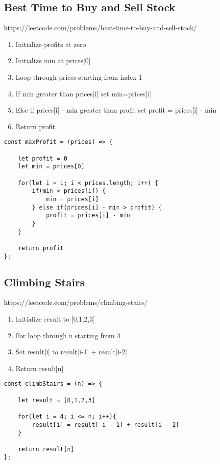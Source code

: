 \documentclass[10pt]{article}
\begin{document}
\medskip %







\pagebreak %
\medskip   
\subsection{Best Time to Buy and Sell Stock}
https://leetcode.com/problems/best-time-to-buy-and-sell-stock/

\begin{enumerate}
	\item Initialize profits at zero
	\item Initialize min at prices[0]
	\item Loop through prices starting from index 1 
	\item If min greater than prices[i] set min=prices[i]
	\item Else if prices[i] - min greater than profit set profit = prices[i] - min
	\item Return profit
\end{enumerate}

\begin{lstlisting}[title=Solution maxProfit, captionpos=t]
const maxProfit = (prices) => {
    
    let profit = 0
    let min = prices[0]
    
    for(let i = 1; i < prices.length; i++) { 
        if(min > prices[i]) {
            min = prices[i]
        } else if(prices[i] - min > profit) {
            profit = prices[i] - min
        }
    }
    
    return profit
};
\end{lstlisting}

\medskip %









\pagebreak %
\medskip   
\subsection{Climbing Stairs}
https://leetcode.com/problems/climbing-stairs/

\begin{enumerate}
	\item Initialize result to [0,1,2,3]
	\item For loop through n starting from 4
	\item Set result[i] to result[i-1] + result[i-2]
	\item Return result[n]
\end{enumerate}

\begin{lstlisting}[title=Solution climbStairs, captionpos=t]
const climbStairs = (n) => {

    let result = [0,1,2,3]
    
    for(let i = 4; i <= n; i++){
        result[i] = result[ i - 1] + result[i - 2]
    }
    
    return result[n]
};
\end{lstlisting}

\medskip %
\end{document}
